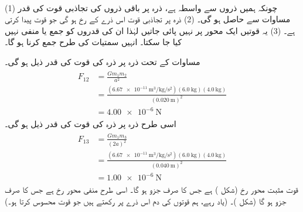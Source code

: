 \\
(1)  چونکہ  ہمیں ذروں سے واسطہ ہے، ذرہ  پر باقی ذروں کی  تجاذبی قوت کی قدر  مساوات      سے حاصل ہو گی۔ (2)  ذرہ  پر تجاذبی قوت  اس ذرے  کے رخ ہو گی جو قوت پیدا کرتی ہے۔ (3)  یہ قوتیں ایک محور پر نہیں پائی جاتیں لہٰذا  ان  کی قدروں  کو جمع یا منفی نہیں کیا جا سکتا۔ انہیں سمتیات کی طرح جمع کرنا ہو گا۔

\quad
مساوات  کے تحت ذرہ  پر ذرہ  کی قوت  کی قدر ذیل ہو گی۔
\begin{gather}
\begin{aligned}
F_{12}&=\frac{Gm_1m_2}{a^2}\\
&=\frac{(\SI{6.67e-11}{\meter\cubed\per\kilo\gram\per\second\squared})(\SI{6.0}{\kilo\gram})(\SI{4.0}{\kilo\gram})}{(\SI{0.020}{\meter})^2}\\
&=\SI{4.00e-6}{\newton}
\end{aligned}
\end{gather}
اسی طرح ذرہ  پر ذرہ  کی قوت کی قدر ذیل ہو گی۔
\begin{gather}
\begin{aligned}
F_{13}&=\frac{Gm_1m_3}{(2a)^2}\\
&=\frac{(\SI{6.67e-11}{\meter\cubed\per\kilo\gram\per\second\squared})(\SI{6.0}{\kilo\gram})(\SI{4.0}{\kilo\gram})}{(\SI{0.040}{\meter})^2}\\
&=\SI{1.00e-6}{\newton}
\end{aligned}
\end{gather}
قوت  مثبت محور    رخ (شکل )  ہے جس کا صرف  جزو  ہو گا۔ اسی طرح   منفی محور  رخ ہے جس کا صرف  جزو  ہو گا (شکل )۔ (یاد  رہے، ہم قوتوں کی دم اس ذرے پر رکھتے ہیں جو قوت محسوس کرتا ہو۔)

